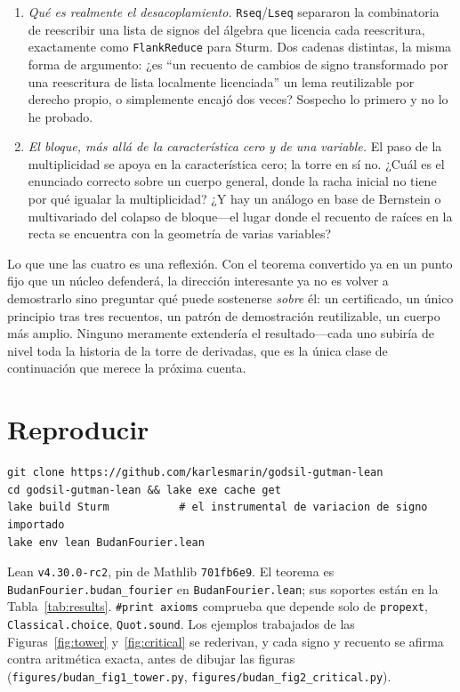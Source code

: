 \documentclass[11pt]{article}
\newcommand{\lean}[1]{\texttt{#1}}
\begin{document}
\begin{enumerate}
\item \emph{Qu\'e es realmente el desacoplamiento.} \lean{Rseq}/\lean{Lseq} separaron la combinatoria de
reescribir una lista de signos del \'algebra que licencia cada reescritura, exactamente como
\lean{FlankReduce} para Sturm. Dos cadenas distintas, la misma forma de argumento: ¿es ``un recuento de
cambios de signo transformado por una reescritura de lista localmente licenciada'' un lema reutilizable
por derecho propio, o simplemente encaj\'o dos veces? Sospecho lo primero y no lo he probado.

\item \emph{El bloque, m\'as all\'a de la caracter\'istica cero y de una variable.} El paso de la
multiplicidad se apoya en la caracter\'istica cero; la torre en s\'i no. ¿Cu\'al es el enunciado correcto
sobre un cuerpo general, donde la racha inicial no tiene por qu\'e igualar la multiplicidad? ¿Y hay un
an\'alogo en base de Bernstein o multivariado del colapso de bloque---el lugar donde el recuento de
ra\'ices en la recta se encuentra con la geometr\'ia de varias variables?
\end{enumerate}

\noindent Lo que une las cuatro es una reflexi\'on. Con el teorema convertido ya en un punto fijo que un
n\'ucleo defender\'a, la direcci\'on interesante ya no es volver a demostrarlo sino preguntar qu\'e puede
sostenerse \emph{sobre} \'el: un certificado, un \'unico principio tras tres recuentos, un patr\'on de
demostraci\'on reutilizable, un cuerpo m\'as amplio. Ninguno meramente extender\'ia el resultado---cada
uno subir\'ia de nivel toda la historia de la torre de derivadas, que es la \'unica clase de
continuaci\'on que merece la pr\'oxima cuenta.

\section*{Reproducir}
\begin{verbatim}
git clone https://github.com/karlesmarin/godsil-gutman-lean
cd godsil-gutman-lean && lake exe cache get
lake build Sturm           # el instrumental de variacion de signo importado
lake env lean BudanFourier.lean
\end{verbatim}
Lean \lean{v4.30.0-rc2}, pin de Mathlib \lean{701fb6e9}. El teorema es
\lean{BudanFourier.budan\_fourier} en \lean{BudanFourier.lean}; sus soportes est\'an en la
Tabla~\ref{tab:results}. \lean{\#print axioms} comprueba que depende solo de \lean{propext},
\lean{Classical.choice}, \lean{Quot.sound}. Los ejemplos trabajados de las Figuras~\ref{fig:tower}
y~\ref{fig:critical} se rederivan, y cada signo y recuento se afirma contra aritm\'etica exacta, antes
de dibujar las figuras (\lean{figures/budan\_fig1\_tower.py}, \lean{figures/budan\_fig2\_critical.py}).
\end{document}
